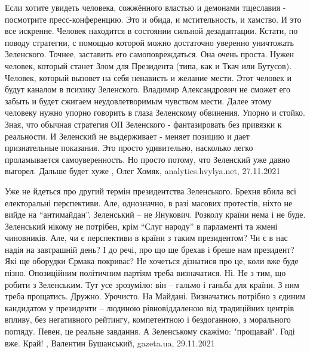 Если хотите увидеть человека, сожжённого властью и демонами тщеславия -
посмотрите пресс-конференцию. Это и обида, и мстительность, и хамство. И это
все искренне. Человек находится в состоянии сильной дезадаптации.
Кстати, по поводу стратегии, с помощью которой можно достаточно уверенно
уничтожать Зеленского. Точнее, заставить его самоповреждаться. Она очень
проста. Нужен человек, который станет Злом для Президента (типа, как и Ткач или
Бутусов). Человек, который вызовет на себя ненависть и желание мести. Этот
человек и будут каналом в психику Зеленского. Владимир Александрович не сможет
его забыть и будет сжигаем неудовлетворимым чувством мести. Далее этому
человеку нужно упорно говорить в глаза Зеленскому обвинения. Упорно и стойко.
Зная, что обычная стратегия ОП Зеленского - фантазировать без привязки к
реальности. И Зеленский не выдерживает - меняет позицию и дает признательные
показания. Это просто удивительно, насколько легко проламывается
самоуверенность. Но просто потому, что Зеленский уже давно выгорел. Дальше
будет хуже
, 
Олег Хомяк, analytics.hvylya.net, 27.11.2021

Уже не йдеться про другий термін президентства Зеленського. Брехня вбила всі
електоральні перспективи. Але, однозначно, в разі масових протестів, ніхто не
вийде на \enquote{антимайдан}. Зеленський – не Янукович. Розколу країни нема і не буде.
Зеленський нікому не потрібен, крім \enquote{Слуг народу} в парламенті та жмені
чиновників.  Але, чи є перспективи в країни з таким президентом? Чи є в нас
надія на завтрашній день? І до речі, про що ще брехав і бреше нам президент?
Які ще оборудки Єрмака покриває? Не хочеться дізнатися про це, коли вже буде
пізно.  Опозиційним політичним партіям треба визначатися. Ні. Не з тим, що
робити з Зеленським. Тут усе зрозуміло: він – гальмо і ганьба для країни. З ним
треба прощатись. Дружно. Урочисто. На Майдані.  Визначатись потрібно з єдиним
кандидатом у президенти – людиною рівновіддаленою від традиційних центрів
впливу, без негативного рейтингу, компетентною і бездоганною, з морального
погляду. Певен, це реальне завдання.  А Зеленському скажімо: "прощавай". Годі
вже. Край!
, 
Валентин Бушанський, gazeta.ua, 29.11.2021
